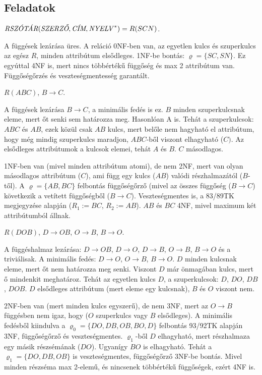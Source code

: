 \documentclass[a5paper]{article}
\begin{document}
\subsection*{Feladatok}


$\hbox{\it RSZÓTÁR}(\hbox{\it SZERZŐ},\hbox{\it CÍM},\hbox{\it NYELV\/}^*)=
R(SCN)$. %

\megoldas A függések lezárása üres.
A reláció 0NF-ben van, az egyetlen kulcs és szuperkulcs az egész $R$, minden
 attribútum elsődleges. 1NF-be bontás: $\varrho=\{SC, SN\}$. Ez egyúttal 4NF
is, mert nincs többértékű függőség és max 2 attribútum van. Függőségőrzés és
veszteségmentesség garantált.

$R(ABC)$, $B\to C$.

\megoldas A függések lezárása $B\to C$, a minimális fedés is ez.
$B$ minden szuperkulcsnak eleme, mert őt senki sem határozza meg. Hasonlóan
A is. Tehát a szuperkulcsok: $ABC$ és $AB$, ezek közül csak $AB$ kulcs, mert
belőle nem hagyható el attribútum, hogy még mindig szuperkulcs maradjon,
$ABC$-ből viszont elhagyható ($C)$. Az elsődleges attribútumok a kulcsok elemei,
tehát $A$ és $B$. $C$ másodlagos.

1NF-ben van (mivel minden attribútum atomi), de nem 2NF, mert van olyan
másodlagos attribútum ($C$), ami függ egy kulcs ($AB$) valódi részhalmazától
($B$-től). A $\varrho=\{AB, BC\}$ felbontás függőségőrző (mivel az összes
függőség ($B\to C$) következik a vetített függőségből ($B\to C$).
Veszteségmentes is, a 83/89TK megjegyzése alapján ($R_1:=BC$, $R_2:=AB$). $AB$
és $BC$ 4NF, mivel maximum két attribútumból állnak.

$R(DOB)$, $D\to OB$, $O\to B$, $B\to O$.

\megoldas A függéshalmaz lezárása: $D\to OB$, $D\to O$, $D\to B$, $O\to B$, $B\to O$
és a triviálisak.
A minimális fedés: $D\to O$, $O\to B$, $B\to O$.
$D$ minden kulcsnak eleme, mert őt nem határozza meg senki.
Viszont $D$ már önmagában kulcs, mert ő mindenkit meghatároz. Tehát az
egyetlen kulcs $D$, a szuperkulcsok: $D$, $DO$, $DB$, $DOB$. $D$ elsődleges
attribútum (mert eleme egy kulcsnak), $B$ és $O$ viszont nem.

2NF-ben van (mert minden kulcs egyszerű), de nem 3NF, mert az $O\to B$
függésben nem igaz, hogy ($O$ szuperkulcs vagy $B$ elsődleges). A minimális
fedésből kiindulva a $\varrho_0=\{DO,DB,OB,BO,D\}$ felbontás 93/92TK alapján 3NF,
függőségőrző és veszteségmentes. $\varrho_1$-ből $D$ elhagyható, mert
részhalmaza egy másik részsémának ($DO$). Ugyanígy $BO$ is elhagyható. Tehát
a $\varrho_1=\{DO,DB,OB\}$ is veszteségmentes, függőségőrző 3NF-be bontás.
Mivel minden részséma max 2-elemű, és nincsenek többértékű függőségek,
ezért 4NF is.
\end{document}
